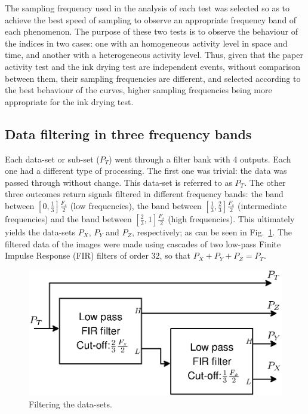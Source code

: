 \documentclass[review]{elsarticle}
\begin{document}
The sampling frequency used in the analysis of each test 
was selected so as to achieve the best speed of sampling to observe 
an appropriate frequency band of each phenomenon.
The purpose of these two tests is to observe the behaviour of the indices in two cases: 
one with an homogeneous activity level in space and time, and another with a heterogeneous activity level.
Thus, given that the paper activity test and the ink drying test are independent events, 
without comparison between them, their sampling frequencies are different,
and selected according to the best behaviour of the curves, 
higher sampling frequencies being more appropriate for the ink drying test.

\subsection{Data filtering in three frequency bands}
\label{subsec:firfilters}
Each data-set or sub-set ($P_T$) went through a filter bank with 4 outputs. Each
one had a different type of processing. The first one was trivial: 
the data was passed through without change. This data-set is referred to as $P_T$. The other three outcomes
return  signals filtered in different frequency bands: 
the band between $[0,\frac{1}{3}]\frac{F_s}{2}$ (low frequencies),
the band between $[\frac{1}{3},\frac{2}{3}]\frac{F_s}{2}$ (intermediate frequencies) and
the band between $[\frac{2}{3},1]\frac{F_s}{2}$ (high frequencies). This ultimately yields the data-sets 
$P_X$, $P_Y$ and $P_Z$, respectively; as can be seen in Fig.~\ref{fig:firfilters}.
The filtered data of the images were made using cascades
of two low-pass Finite Impulse Response (FIR) filters of order $32$, so that
$P_X+P_Y+P_Z=P_T$.
\begin{figure}[h!]
\centering
\includegraphics[width=0.55\columnwidth]{firfilters.eps}
\caption{Filtering the data-sets.}
\label{fig:firfilters}
\end{figure}
\end{document}
